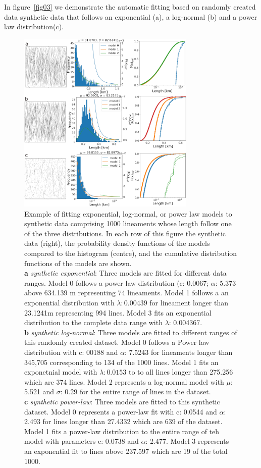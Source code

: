 \documentclass[a4paper,fleqn]{cas-sc}
\begin{document}
In figure~\ref{fig03} we demonstrate the automatic fitting based on randomly created data synthetic data that follows an exponential (a), a log-normal (b) and a power law distribution(c).

\begin{figure}[h]
\centering
	\includegraphics[width=8.5cm]{fig02.jpg}
	\caption{Example of fitting exponential, log-normal, or power law models to synthetic data comprising 1000 lineaments whose length follow one of the three distributions. In each row of this figure the synthetic data (right), the probability density functions of the models compared to the histogram (centre), and the cumulative distribution functions of the models are shown. \\
\textbf{a} \textit{synthetic exponential}: Three models are fitted for different data ranges. Model 0 follows a power law distribution (c: 0.0067; $\alpha$: 5.373 above 634.139 m representing 74 lineaments. Model 1 follows a an exponential distribution with $\lambda: 0.00439$ for lineament longer than 23.1241m  representing  994 lines. Model 3 fits an exponential distribution to the complete data range with $\lambda$: 0.004367. \\
\textbf{b} \textit{synthetic log-normal}: Three models are fitted to different ranges of this randomly created dataset. Model 0 follows a Power law distribution with c: 00188 and $\alpha$: 7.5243 for lineaments longer than 345,705 corresponding to 134 of the 1000 lines. Model 1 fits an exponetnial model with $\lambda: 0.0153$ to to all lines longer than 275.256 which are 374 lines. Model 2 represents a log-normal model with $\mu:$ 5.521 and $\sigma$: 0.29 for the entire range of lines in the dataset.  \\
\textbf{c} \textit{synthetic power-law}: Three models are fitted to this synthetic dataset. Model 0 represents a power-law fit with c: 0.0544 and $\alpha$: 2.493 for lines longer than 27.4332 which are 639 of the dataset. Model 1 fits a power-law distribution to the entire range of teh model with parameters c: 0.0738 and $\alpha$: 2.477. Model 3 represents an exponential fit to lines above 237.597 which are 19 of the total 1000.}
\label{fig02}
\end{figure}
\end{document}
